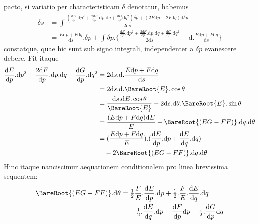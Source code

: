 %
pacto, si variatio per characteristicam \(\delta\) denotatur, habemus
\[
\begin{aligned}
\delta s&=\int\frac{(\tfrac{\mathrm{d}E}{\mathrm{d}p}\mathord{.}\mathrm{d}p^2+\tfrac{2\mathrm{d}F}{\mathrm{d}p}\mathord{.}\mathrm{d}p\mathord{.}\mathrm{d}q+\tfrac{\mathrm{d}G}{\mathrm{d}p}\mathrm{d}q^2)\delta p+(2E\mathrm{d}p+2F\mathrm{d}q)\mathrm{d}\delta p}{2\mathrm{d}s}\\
&=\frac{E\mathrm{d}p+F\mathrm{d}q}{\mathrm{d}s}\mathord{.}\delta p+\int\delta p\mathord{.}\{\frac{\tfrac{\mathrm{d}E}{\mathrm{d}p}\mathord{.}\mathrm{d}p^2+\tfrac{2\mathrm{d}F}{\mathrm{d}p}\mathord{.}\mathrm{d}p\mathord{.}\mathrm{d}q+\tfrac{\mathrm{d}G}{\mathrm{d}p}\mathord{.}\mathrm{d}q^2}{2\mathrm{d}s}-\mathrm{d}\mathord{.}\frac{E\mathrm{d}p+F\mathrm{d}q}{\mathrm{d}s}\}
\end{aligned}
\]
constatque, quae hic sunt sub signo integrali, independenter a \(\delta p\) evanescere debere. Fit itaque
\[
\begin{aligned}
\frac{\mathrm{d}E}{\mathrm{d}p}\mathord{.}\mathrm{d}p^2+\frac{2\mathrm{d}F}{\mathrm{d}p}\mathord{.}\mathrm{d}p\mathord{.}\mathrm{d}q+\frac{\mathrm{d}G}{\mathrm{d}p}\mathord{.}\mathrm{d}q^2&=2\mathrm{d}s\mathord{.}\mathrm{d}\mathord{.}\frac{E\mathrm{d}p+F\mathrm{d}q}{\mathrm{d}s}\\
&=2\mathrm{d}s\mathord{.}\mathrm{d}\mathord{.}\BareRoot{E}\mathord{.}\cos\theta\\
&=\frac{\mathrm{d}s\mathord{.}\mathrm{d}E\mathord{.}\cos\theta}{\BareRoot{E}}-2\mathrm{d}s\mathord{.}\mathrm{d}\theta\mathord{.}\BareRoot{E}\mathord{.}\sin\theta\\
&=\frac{(E\mathrm{d}p+F\mathrm{d}q)\mathrm{d}E}{E}-\BareRoot{(EG-FF)}\mathord{.}\mathrm{d}q\mathord{.}\mathrm{d}\theta\\
&=(\frac{E\mathrm{d}p+F\mathrm{d}q}{E})\mathord{.}(\frac{\mathrm{d}E}{\mathrm{d}p}\mathord{.}\mathrm{d}p+\frac{\mathrm{d}E}{\mathrm{d}q}\mathord{.}\mathrm{d}q)\\
&\quad-2\BareRoot{(EG-FF)}\mathord{.}\mathrm{d}q\mathord{.}\mathrm{d}\theta
\end{aligned}
\]
Hinc itaque nanciscimur aequationem conditionalem pro linea brevissima sequentem:
\[
\begin{aligned}
\BareRoot{(EG-FF)}\mathord{.}\mathrm{d}\theta
&=\tfrac{1}{2}\frac{F}{E}\mathord{.}\frac{\mathrm{d}E}{\mathrm{d}p}\mathord{.}\mathrm{d}p+\tfrac{1}{2}\mathord{.}\frac{F}{E}\mathord{.}\frac{\mathrm{d}E}{\mathrm{d}q}\mathord{.}\mathrm{d}q\\
&\quad+\tfrac{1}{2}\mathord{.}\frac{\mathrm{d}E}{\mathrm{d}q}\mathord{.}\mathrm{d}p-\frac{\mathrm{d}F}{\mathrm{d}p}\mathrm{d}p-\tfrac{1}{2}\mathord{.}\frac{\mathrm{d}G}{\mathrm{d}p}\mathrm{d}q
\end{aligned}
\]
